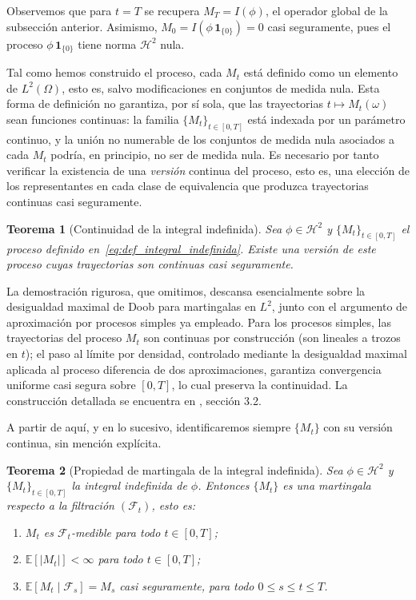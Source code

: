 \documentclass[11pt,a4paper,oneside]{report}
\theoremstyle{plain}
\newtheorem{teorema}{Teorema}[chapter]
\theoremstyle{definition}
\theoremstyle{remark}
\newcommand{\E}{\mathbb{E}}
\newcommand{\F}{\mathcal{F}}
\newcommand{\1}{\mathbf{1}}
\begin{document}
Observemos que para $t = T$ se recupera $M_T = I(\phi)$, el operador
global de la subsección anterior. Asimismo, $M_0 = I(\phi\,
\mathbf{1}_{\{0\}}) = 0$ casi seguramente, pues el proceso $\phi\,
\mathbf{1}_{\{0\}}$ tiene norma $\mathcal{H}^2$ nula.

Tal como hemos
construido el proceso, cada $M_t$ está definido como un elemento de
$L^2(\Omega)$, esto es, salvo modificaciones en conjuntos de medida
nula. Esta forma de definición no garantiza, por sí sola, que las
trayectorias $t \mapsto M_t(\omega)$ sean funciones continuas: la
familia $\{M_t\}_{t \in [0, T]}$ está indexada por un parámetro
continuo, y la unión no numerable de los conjuntos de medida nula
asociados a cada $M_t$ podría, en principio, no ser de medida nula.
Es necesario por tanto verificar la existencia de una \emph{versión}
continua del proceso, esto es, una elección de los representantes en
cada clase de equivalencia que produzca trayectorias continuas casi
seguramente.

\begin{teorema}[Continuidad de la integral indefinida]
\label{teo:continuidad_integral_indefinida}
Sea $\phi \in \mathcal{H}^2$ y $\{M_t\}_{t \in [0, T]}$ el proceso
definido en~\eqref{eq:def_integral_indefinida}. Existe una versión de
este proceso cuyas trayectorias son continuas casi seguramente.
\end{teorema}

La demostración rigurosa, que omitimos, descansa esencialmente sobre la
desigualdad maximal de Doob para martingalas en $L^2$, junto con el
argumento de aproximación por procesos simples ya empleado. Para los
procesos simples, las trayectorias del proceso $M_t$ son continuas por
construcción (son lineales a trozos en $t$); el paso al límite por
densidad, controlado mediante la desigualdad maximal aplicada al
proceso diferencia de dos aproximaciones, garantiza convergencia
uniforme casi segura sobre $[0, T]$, lo cual preserva la continuidad.
La construcción detallada se encuentra en \cite{karatzas-shreve},
sección 3.2.

A partir de aquí, y en lo sucesivo, identificaremos siempre $\{M_t\}$
con su versión continua, sin mención explícita.

\begin{teorema}[Propiedad de martingala de la integral indefinida]
\label{teo:martingala_integral_indefinida}
Sea $\phi \in \mathcal{H}^2$ y $\{M_t\}_{t \in [0, T]}$ la integral
indefinida de $\phi$. Entonces $\{M_t\}$ es una martingala respecto a
la filtración $(\F_t)$, esto es:
\begin{enumerate}[label=\textnormal{(\roman*)}]
  \item $M_t$ es $\F_t$-medible para todo $t \in [0, T]$;
  \item $\E[|M_t|] < \infty$ para todo $t \in [0, T]$;
  \item $\E[M_t \mid \F_s] = M_s$ casi seguramente, para todo $0 \leq s
        \leq t \leq T$.
\end{enumerate}
\end{teorema}
\end{document}
